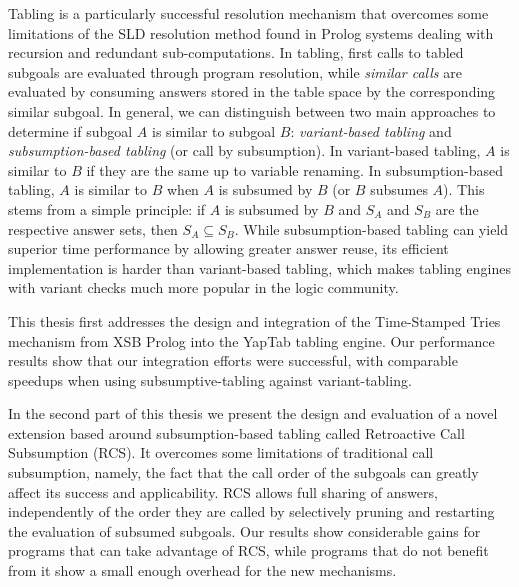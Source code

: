 Tabling is a particularly successful resolution mechanism that overcomes some limitations
of the SLD resolution method found in Prolog systems dealing with recursion and redundant
sub-computations. In tabling, first calls to tabled subgoals are evaluated through
program resolution, while \emph{similar calls} are evaluated by consuming answers stored
in the table space by the corresponding similar subgoal.
In general, we can distinguish between two main approaches to determine if subgoal $A$ is
similar to subgoal $B$: \emph{variant-based tabling} and \emph{subsumption-based tabling}
(or call by subsumption). In variant-based tabling, $A$ is similar to $B$ if they are the same
up to variable renaming. In subsumption-based tabling, $A$ is similar to $B$ when $A$ is subsumed
by $B$ (or $B$ subsumes $A$). This stems from a simple principle: if $A$ is subsumed by $B$ and
$S_A$ and $S_B$ are the respective answer sets, then $S_A \subseteq S_B$.
While subsumption-based tabling can yield superior time performance by allowing greater answer
reuse, its efficient implementation is harder than variant-based tabling, which makes tabling engines
with variant checks much more popular in the logic community.

This thesis first addresses the design and integration of the Time-Stamped Tries mechanism
from XSB Prolog into the YapTab tabling engine. Our performance results show that our integration efforts
were successful, with comparable speedups when using subsumptive-tabling against variant-tabling.

In the second part of this thesis we present the design and evaluation of a novel extension
based around subsumption-based tabling called Retroactive Call Subsumption (RCS). It overcomes some limitations
of traditional call subsumption, namely, the fact that the call order of the subgoals can greatly affect its
success and applicability. RCS allows full sharing of answers,
independently of the order they are called by selectively pruning and restarting the evaluation of subsumed
subgoals. Our results show considerable gains for programs that can take advantage of RCS, while programs
that do not benefit from it show a small enough overhead for the new mechanisms.